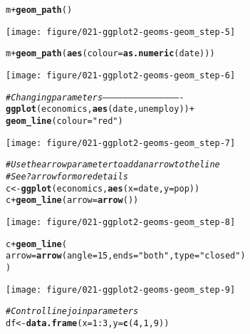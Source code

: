 \documentclass[a4paper,titlepage]{tufte-handout}\usepackage[]{graphicx}\usepackage[]{color}
\makeatletter
\def\maxwidth{ %
  \ifdim\Gin@nat@width>\linewidth
    \linewidth
  \else
    \Gin@nat@width
  \fi
}
\newcommand{\hlnum}[1]{\textcolor[rgb]{0.686,0.059,0.569}{#1}}%
\newcommand{\hlstr}[1]{\textcolor[rgb]{0.192,0.494,0.8}{#1}}%
\newcommand{\hlcom}[1]{\textcolor[rgb]{0.678,0.584,0.686}{\textit{#1}}}%
\newcommand{\hlopt}[1]{\textcolor[rgb]{0,0,0}{#1}}%
\newcommand{\hlstd}[1]{\textcolor[rgb]{0.345,0.345,0.345}{#1}}%
\newcommand{\hlkwb}[1]{\textcolor[rgb]{0.69,0.353,0.396}{#1}}%
\newcommand{\hlkwc}[1]{\textcolor[rgb]{0.333,0.667,0.333}{#1}}%
\newcommand{\hlkwd}[1]{\textcolor[rgb]{0.737,0.353,0.396}{\textbf{#1}}}%
\newenvironment{kframe}{%
 \def\at@end@of@kframe{}%
 \ifinner\ifhmode%
  \def\at@end@of@kframe{\end{minipage}}%
  \begin{minipage}{\columnwidth}%
 \fi\fi%
 \def\FrameCommand##1{\hskip\@totalleftmargin \hskip-\fboxsep
 \colorbox{shadecolor}{##1}\hskip-\fboxsep
     \hskip-\linewidth \hskip-\@totalleftmargin \hskip\columnwidth}%
 \MakeFramed {\advance\hsize-\width
   \@totalleftmargin\z@ \linewidth\hsize
   \@setminipage}}%
 {\par\unskip\endMakeFramed%
 \at@end@of@kframe}
\newenvironment{knitrout}{}{} %
\makeatother
\begin{document}
\begin{knitrout}
\begin{kframe}
\begin{alltt}
\hlstd{m} \hlopt{+} \hlkwd{geom_path}\hlstd{()}
\end{alltt}
\end{kframe}
\texttt{[image: figure/021-ggplot2-geoms-geom\_step-5]} 
\begin{kframe}\begin{alltt}
\hlstd{m} \hlopt{+} \hlkwd{geom_path}\hlstd{(}\hlkwd{aes}\hlstd{(}\hlkwc{colour} \hlstd{=} \hlkwd{as.numeric}\hlstd{(date)))}
\end{alltt}
\end{kframe}
\texttt{[image: figure/021-ggplot2-geoms-geom\_step-6]} 
\begin{kframe}\begin{alltt}
\hlcom{# Changing parameters ----------------------------------------------}
\hlkwd{ggplot}\hlstd{(economics,} \hlkwd{aes}\hlstd{(date, unemploy))} \hlopt{+}
  \hlkwd{geom_line}\hlstd{(}\hlkwc{colour} \hlstd{=} \hlstr{"red"}\hlstd{)}
\end{alltt}
\end{kframe}
\texttt{[image: figure/021-ggplot2-geoms-geom\_step-7]} 
\begin{kframe}\begin{alltt}
\hlcom{# Use the arrow parameter to add an arrow to the line}
\hlcom{# See ?arrow for more details}
\hlstd{c} \hlkwb{<-} \hlkwd{ggplot}\hlstd{(economics,} \hlkwd{aes}\hlstd{(}\hlkwc{x} \hlstd{= date,} \hlkwc{y} \hlstd{= pop))}
\hlstd{c} \hlopt{+} \hlkwd{geom_line}\hlstd{(}\hlkwc{arrow} \hlstd{=} \hlkwd{arrow}\hlstd{())}
\end{alltt}
\end{kframe}
\texttt{[image: figure/021-ggplot2-geoms-geom\_step-8]} 
\begin{kframe}\begin{alltt}
\hlstd{c} \hlopt{+} \hlkwd{geom_line}\hlstd{(}
  \hlkwc{arrow} \hlstd{=} \hlkwd{arrow}\hlstd{(}\hlkwc{angle} \hlstd{=} \hlnum{15}\hlstd{,} \hlkwc{ends} \hlstd{=} \hlstr{"both"}\hlstd{,} \hlkwc{type} \hlstd{=} \hlstr{"closed"}\hlstd{)}
\hlstd{)}
\end{alltt}
\end{kframe}
\texttt{[image: figure/021-ggplot2-geoms-geom\_step-9]} 
\begin{kframe}\begin{alltt}
\hlcom{# Control line join parameters}
\hlstd{df} \hlkwb{<-} \hlkwd{data.frame}\hlstd{(}\hlkwc{x} \hlstd{=} \hlnum{1}\hlopt{:}\hlnum{3}\hlstd{,} \hlkwc{y} \hlstd{=} \hlkwd{c}\hlstd{(}\hlnum{4}\hlstd{,} \hlnum{1}\hlstd{,} \hlnum{9}\hlstd{))}

\end{alltt}
\end{kframe}
\end{knitrout}
\end{document}
